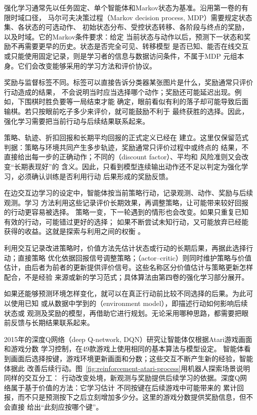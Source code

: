 强化学习通常先以任务固定、单个智能体和Markov状态为基准。沿用第一卷的有限时域口径，
马尔可夫决策过程（Markov decision process, MDP）需要规定状态集、各状态的可选动作、
初始状态分布、受控状态转移、各阶段与终点的奖励，以及时域。它的Markov条件要求：给定
当前状态与动作以后，预测下一状态和奖励不再需要更早的历史。状态是否完全可见、转移模型
是否已知、能否在线交互或只能使用固定记录，则是学习者的信息与数据访问条件，不属于MDP
元组本身。它们会改变能够采用的学习方法和评价协议。

奖励与监督标签不同。标签可以直接告诉分类器某张图片是什么，奖励通常只评价行动造成的结果，
不会说明当时应当选择哪个动作；奖励还可能延迟出现。例如，下围棋时胜负要等一局结束才能
确定，眼前看似有利的落子却可能导致后面输棋。若只按眼前吃子多少来评价，就可能鼓励不利于
最终获胜的选择。因此，强化学习需要把当前行动与后续结果联系起来。

策略、轨迹、折扣回报和长期平均回报的正式定义已经在
建立。这里仅保留范式判据：策略与环境共同产生多步轨迹，奖励通常只评价过程中或终点的
结果，不直接给出每一步的正确动作；不同的（discount factor）、平均和
风险准则又会改变“长期表现好”的
含义。因此，只看到模型连续输出动作还不足以判定为强化学习，必须确认训练是否利用行动
后果形成的奖励反馈。

在边交互边学习的设定中，智能体按当前策略行动，记录观测、动作、奖励与后续观测。学习
方法利用这些记录评价长期效果，再调整策略，让可能带来较好回报的行动更容易被选择。
策略一变，下一轮遇到的情形也会改变。如果只重复已知有效的行动，可能错过更好的选择；
如果不断尝试未知行动，又可能放弃已经能获得的收益。这就是探索与利用之间的权衡
。

利用交互记录改进策略时，价值方法先估计状态或行动的长期后果，再据此选择行动；直接策略
优化依据回报信号调整策略；（actor--critic）则同时维护策略与价值
估计，由后者为前者的更新提供评价信号。这些名称区分价值估计与策略更新怎样配合，不是经验
来源或新的学习范式；具体算法由第四卷的强化学习部分展开。

如果还能够预测环境怎样变化，就可以在真正行动前比较不同选择的后果。为此可以使用已知
或从数据中学到的（environment model），即描述行动如何影响后续状态或
观测及奖励的模型，再借助它进行规划。无论采用哪种思路，都需要把眼前反馈与长期结果联系起来。

2015年的深度Q网络（deep Q-network, DQN）研究让智能体仅根据Atari游戏画面和游戏分数
学习控制，在49款游戏上使用相同的基本算法与模型设定。
智能体看到画面后选择按键，游戏环境更新画面和分数；这些交互不断产生新的经验，智能体据此
改善后续行动。图~\ref{fig:reinforcement-atari-process}用机器人探索场景说明同样的交互分工：
行动改变处境，新观测与奖励提供后续学习的依据。深度Q网络属于基于价值的方法：它学习估计
不同按键在后续游戏中可能带来的
累计回报，而不只是预测按下之后立刻增加多少分。这里的游戏分数提供奖励信息，但不会直接
给出“此刻应按哪个键”。


